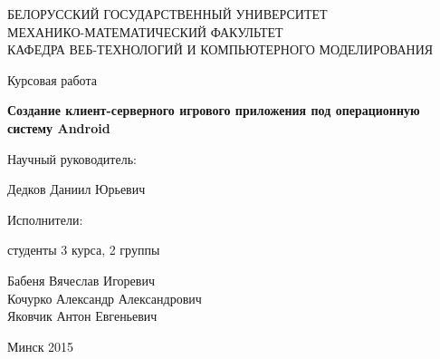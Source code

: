 \begin{titlepage}
\newpage

\begin{center}
БЕЛОРУССКИЙ ГОСУДАРСТВЕННЫЙ УНИВЕРСИТЕТ \\
МЕХАНИКО-МАТЕМАТИЧЕСКИЙ ФАКУЛЬТЕТ\\
КАФЕДРА ВЕБ-ТЕХНОЛОГИЙ И КОМПЬЮТЕРНОГО МОДЕЛИРОВАНИЯ
\end{center}
 
\vspace{14em}

\begin{center}
Курсовая работа
\end{center}

\begin{center}
\Large \textbf{Создание клиент-серверного игрового приложения \linebreak под операционную систему Android}
\end{center}

\vspace{11em}
 
\begin{flushright}
\parbox{0.45\textwidth}{
Научный руководитель:
\vspace{0.25em}

Дедков Даниил Юрьевич
\vspace{2em}

Исполнители:
\vspace{0.25em}

студенты 3 курса, 2 группы

Бабеня Вячеслав Игоревич \\
Кочурко Александр Александрович \\
Яковчик Антон Евгеньевич
}%
\end{flushright}
 
\vspace{\fill}

\begin{center}
Минск 2015
\end{center}

\end{titlepage} 
